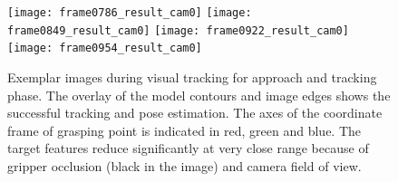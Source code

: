 

%
\begin{figure}
\centering\texttt{[image: frame0786\_result\_cam0]}
\centering\texttt{[image: frame0849\_result\_cam0]}
\centering\texttt{[image: frame0922\_result\_cam0]}
\centering\texttt{[image: frame0954\_result\_cam0]}
\caption{Exemplar images during visual tracking for approach and tracking phase. The overlay of the model contours and image edges shows the successful tracking and pose estimation. The axes of the coordinate frame of grasping point is indicated in red, green and blue. The target features reduce significantly at very close range because of gripper occlusion (black in the image) and camera field of view.}
\label{fig:TrackingImages}
\end{figure}



